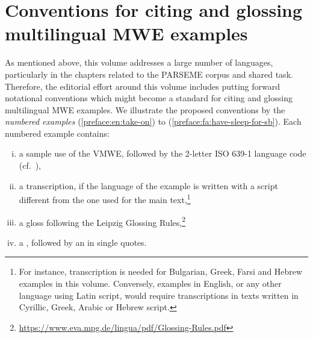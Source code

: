 \documentclass[output=paper,modfonts,]{langscibook}
\begin{document}
\section{Conventions for citing and glossing multilingual MWE examples}

 As mentioned above, this volume addresses a large number of languages, particularly in the chapters related to the PARSEME corpus and shared task. Therefore, the editorial effort around this volume includes putting forward notational conventions which might become a standard for citing and glossing multilingual MWE examples.
We illustrate the proposed conventions by the \emph{numbered examples}  (\ref{preface:en:take-on}) to (\ref{preface:fa:have-sleep-for-sb}). Each numbered example contains:%
\begin{enumerate}[(i)]%
\item\label{ex-line:use} a sample use of the VMWE, followed by the 2-letter ISO 639-1 language code (cf.~),

\item\label{ex-line:transcription} a transcription, if the language of the example is written with a script different from the one used for the main text,\footnote{For instance, transcription is needed for Bulgarian, Greek, Farsi and Hebrew examples in this volume. Conversely, examples in English, or any other language using Latin script, would require transcriptions %
in texts written in Cyrillic, Greek, Arabic or Hebrew script.}


\item\label{ex-line:gloss} a gloss %
following 
the Leipzig Glossing Rules,\footnote{\url{https://www.eva.mpg.de/lingua/pdf/Glossing-Rules.pdf}} 

\item\label{ex-line:trans} a , followed by an  in single quotes. 
\end{enumerate}
\end{document}
